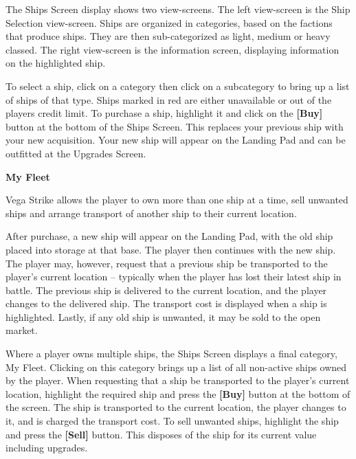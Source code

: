 \documentclass{article}
\begin{document}
The Ships Screen display shows two view-screens. The left view-screen is the Ship Selection view-screen. Ships are organized in categories, based on the factions that produce ships. They are then sub-categorized as light, medium or heavy classed. The right view-screen is the information screen, displaying information on the highlighted ship. 





To select a ship, click on a category then click on a subcategory to bring up a list of ships of that type. Ships marked in red are either unavailable or out of the players credit limit. To purchase a ship, highlight it and click on the \textbf{[Buy] }button at the bottom of the Ships Screen. This replaces your previous ship with your new acquisition. Your new ship will appear on the Landing Pad and can be outfitted at the Upgrades Screen. 



\textbf{My Fleet }

Vega Strike allows the player to own more than one ship at a time, sell unwanted ships and arrange transport of another ship to their current location. 

After purchase, a new ship will appear on the Landing Pad, with the old ship placed into storage at that base. The player then continues with the new ship. The player may, however, request that a previous ship be transported to the player's current location -- typically when the player has lost their latest ship in battle. The previous ship is delivered to the current location, and the player changes to the delivered ship. The transport cost is displayed when a ship is highlighted. Lastly, if any old ship is unwanted, it may be sold to the open market. 

Where a player owns multiple ships, the Ships Screen displays a final category, My Fleet. Clicking on this category brings up a list of all non-active ships owned by the player. When requesting that a ship be transported to the player's current location, highlight the required ship and press the \textbf{[Buy] }button at the bottom of the screen. The ship is transported to the current location, the player changes to it, and is charged the transport cost. To sell unwanted ships, highlight the ship and press the \textbf{[Sell] }button. This disposes of the ship for its current value including upgrades. 





\textbf{}
\end{document}
